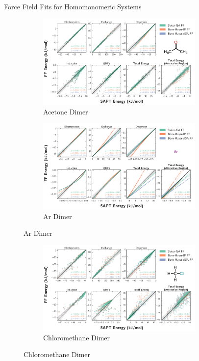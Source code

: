 \begin{section}{Force Field Fits for Homomonomeric Systems}
    \begin{figure}
    \begin{subfigure}{\textwidth}
        \caption{Acetone Dimer}
        \includegraphics[width=0.9\textwidth]{isotropic/si/acetone_acetone_scatter.pdf}
    \end{subfigure}
    \begin{subfigure}{\textwidth}
        \caption{Ar Dimer}
        \includegraphics[width=0.9\textwidth]{isotropic/si/ar_ar_scatter.pdf}
    \end{subfigure}
    \end{figure}
    \begin{figure}
    \ContinuedFloat
    \begin{subfigure}{\textwidth}
        \caption{Chloromethane Dimer}
        \includegraphics[width=0.9\textwidth]{isotropic/si/chloromethane_chloromethane_scatter.pdf}

\end{subfigure}
\end{figure}
\end{section}
